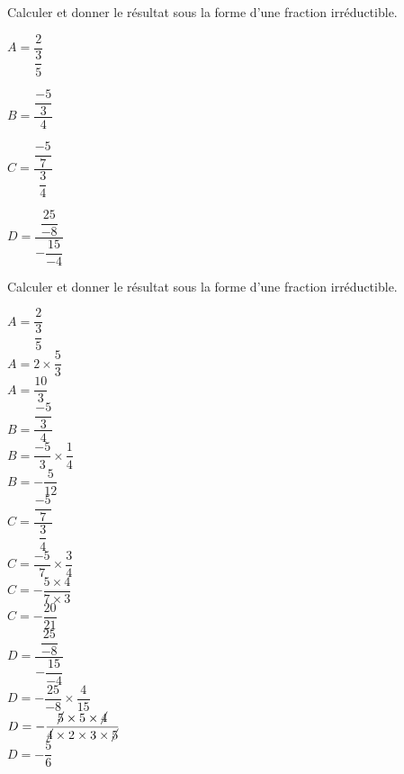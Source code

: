\begin{exercice*}
    Calculer et donner le résultat sous la forme d'une fraction irréductible.
    \begin{multicols}{2}
        \begin{spacing}{2.5}
            \begin{list}{}{}
                \item $A=\dfrac{2}{\dfrac{3}{5}}$
                \item $B=\dfrac{\dfrac{-5}{3}}{4}$
                \item $C=\dfrac{\dfrac{-5}{7}}{\dfrac{3}{4}}$\smallskip
                \item $D=\dfrac{\dfrac{25}{-8}}{-\dfrac{15}{-4}}$
            \end{list}
        \end{spacing}
    \end{multicols}
\end{exercice*}
\begin{corrige}
    Calculer et donner le résultat sous la forme d'une fraction irréductible.
    \begin{multicols}{2}
        \begin{spacing}{2.5}
            \begin{itemize}
                \def\item{}
                \item $A=\dfrac{2}{\dfrac{3}{5}}$\\
                {\red $A=2\times\dfrac{5}{3}$\\$A=\dfrac{10}{3}$}\\
                \item $B=\dfrac{\dfrac{-5}{3}}{4}$\\
                {\red $B=\dfrac{-5}{3}\times\dfrac{1}{4}$\\$B=-\dfrac{5}{12}$}\\
                \columnbreak
                \item $C=\dfrac{\dfrac{-5}{7}}{\dfrac{3}{4}}$\\
                {\red $C=\dfrac{-5}{7}\times\dfrac{3}{4}$\\$C=-\dfrac{5\times 4}{7\times 3}$\\$C=-\dfrac{20}{21}$}\\
                \item $D=\dfrac{\dfrac{25}{-8}}{-\dfrac{15}{-4}}$\\
                {\red $D=-\dfrac{25}{-8}\times\dfrac{4}{15}$\\$D=-\dfrac{\cancel{5}\times 5\times\cancel{4}}{\cancel{4}\times 2\times 3\times\cancel{5}}$\\$D=-\dfrac{5}{6}$}
            \end{itemize}
        \end{spacing}
    \end{multicols}
\end{corrige}

